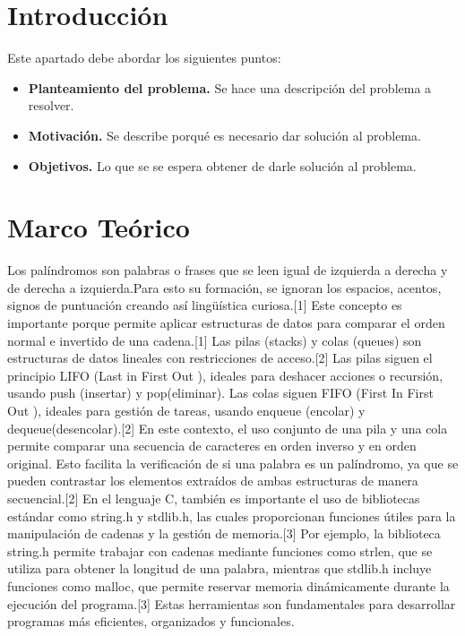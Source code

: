 \documentclass[letterpaper,12pt,oneside]{article}
\begin{document}
\tableofcontents
\clearpage

\section{Introducción}

Este apartado debe abordar los siguientes puntos:

\begin{itemize}
\item \textbf{Planteamiento del problema.} Se hace una descripción del problema a resolver.
\item \textbf{Motivación.} Se describe porqué es necesario dar solución al problema.
\item \textbf{Objetivos.} Lo que se se espera obtener de darle solución al problema.
\end{itemize}

\section{Marco Teórico}

Los palíndromos son palabras o frases que se leen igual de izquierda a derecha y de derecha a izquierda.Para esto su formación, se ignoran los espacios, acentos, signos de puntuación creando así lingüística curiosa.[1]
Este concepto es importante porque permite aplicar estructuras de datos para comparar el orden normal e invertido de una cadena.[1]
Las pilas (stacks) y colas (queues) son estructuras de datos lineales con restricciones de acceso.[2] Las pilas siguen el principio LIFO (Last in First Out ), ideales para deshacer acciones o recursión, usando push (insertar) y pop(eliminar).
Las colas siguen FIFO (First In First Out ), ideales para gestión de tareas, usando enqueue (encolar) y dequeue(desencolar).[2]
En este contexto, el uso conjunto de una pila y una cola permite comparar una secuencia de caracteres en orden inverso y en orden original. Esto facilita la verificación de si una palabra es un palíndromo, ya que se pueden contrastar los elementos extraídos de ambas estructuras de manera secuencial.[2]
En el lenguaje C, también es importante el uso de bibliotecas estándar como string.h y stdlib.h, las cuales proporcionan funciones útiles para la manipulación de cadenas y la gestión de memoria.[3] Por ejemplo, la biblioteca string.h permite trabajar con cadenas mediante funciones como strlen, que se utiliza para obtener la longitud de una palabra, mientras que stdlib.h incluye funciones como malloc, que permite reservar memoria dinámicamente durante la ejecución del programa.[3] Estas herramientas son fundamentales para desarrollar programas más eficientes, organizados y funcionales.
\end{document}
